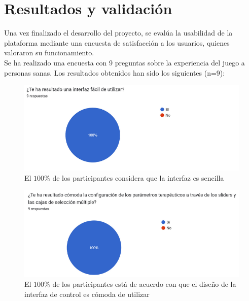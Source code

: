 \chapter{Resultados y validación}
\label{cap:capitulo5}

\vspace{1cm}

Una vez finalizado el desarrollo del proyecto, se evalúa la usabilidad de la plataforma mediante una encuesta de satisfacción a los usuarios, quienes valoraron su funcionamiento.\\

Se ha realizado una encuesta con 9 preguntas sobre la experiencia del juego a personas sanas.
Los resultados obtenidos han sido los siguientes (n=9):
\begin{figure}[ht!]
	\centering
	\begin{minipage}{0.75\linewidth}
		\centering
		\includegraphics[width=\linewidth]{figs/pregunta1.png}
	\end{minipage}
	\caption[Encuesta de satisfacción. Pregunta 1]{El $100\%$ de los participantes considera que la interfaz es sencilla}
	\label{fig:level1}
\end{figure}

\begin{figure}[ht!]
	\centering
	\begin{minipage}{0.75\linewidth}
		\centering
		\includegraphics[width=\linewidth]{figs/pregunta2.png}
	\end{minipage}
	\caption[Encuesta de satisfacción. Pregunta 2]{El $100\%$ de los participantes está de acuerdo con que el diseño de la interfaz de control es cómoda de utilizar}
	\label{fig:level2}
\end{figure}


